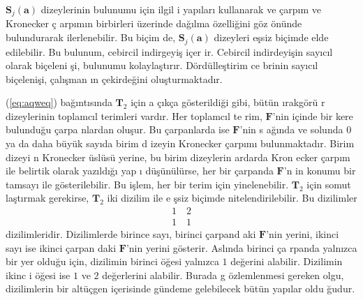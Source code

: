 \documentclass[a4paper,10pt]{article}
\begin{document}
$\mathbf{S}_{j}(\mathbf{a})$ dizeylerinin bulunumu i\c{c}in ilgil%
i yap\i lar{\i} kul\-la\-narak ve \c{c}arp\i m ve Kronecker \c{c}%
arp\i m\i n birbirleri \"uzerinde da\u{g}\i lma \"ozelli\u{g}ini %
g\"oz \"on\"unde bulundurarak iler\-le\-ne\-bilir. Bu bi\-\c{c}im%
de, $\mathbf{S}_{j}(\mathbf{a})$ dizeyleri e\c{s}siz bi\c{c}imde %
elde edilebilir. Bu bulunum, cebircil in\-dirgeyi\c{s} i\-\c{c}er%
ir. Cebircil indirdeyi\c{s}in sa\-y\i c\i l o\-larak bi\c{c}eleni%
\c{s}i, bulunumu kolayla\c{s}t\i r\i r. D\"ord\"ulle\c{s}tirim ce%
brinin say\i c\i l bi\c{c}e\-le\-ni\-\c{s}i, \c{c}a\-l\i \c{s}man%
\i n \c{c}ekirde\u{g}ini olu\c{s}turmaktad\i r.

(\ref{eq:aqweq}) ba\u{g}\i nt\i s\i nda $\mathbf{T}_{2}$ i\c{c}in a%
\c{c}\i k\c{c}a g\"osterildi\u{g}i gibi, b\"ut\"un \i rakg\"or\"u%
r dizeylerinin toplamc\i l terimleri vard\i r. Her toplamc\i l te%
rim, $\mathbf{F}$'nin i\c{c}inde bir kere bulundu\u{g}u \c{c}arpa%
nlardan olu\c{s}ur. Bu \c{c}arpanlar\-da i\-se $\mathbf{F}$'nin s%
a\u{g}\i nda ve solunda $0$ ya da daha b\"uy\"uk say\i da birim d%
izeyin Kronecker \c{c}arp\i m{\i} bulunmaktad\i r. Bi\-rim dizeyi%
n Kronecker \"usl\"us\"u yerine, bu birim dizeylerin ardarda Kron%
ecker \c{c}arp\i m ile belirtik olarak ya\-z\i ld\i \u{g}{\i} yap%
{\i} d\"u\c{s}\"un\"ul\"urse, her bir \c{c}arpanda $\mathbf{F}$'n%
in konumu bir tamsay{\i} ile g\"osterilebilir. Bu i\c{s}lem, her %
bir terim i\c{c}in yinelenebilir. $\mathbf{T}_{2}$ i\c{c}in somut%
la\c{s}t\i rmak gerekirse, $\mathbf{T}_{2}$ iki di\-zi\-lim ile e%
\c{s}siz bi\c{c}imde nitelendirilebilir. Bu dizilimler %
\begin{eqnarray}
 1\quad 2 \nonumber\\
 1\quad 1
\end{eqnarray}
dizilimleridir. Dizilimlerde birince say{\i}, birinci \c{c}arpand%
aki $\mathbf{F}$'nin yerini, ikinci say{\i} ise ikinci \c{c}arpan%
daki $\mathbf{F}$'nin yerini g\"osterir. Asl\i nda birinci \c{c}a%
rpanda yaln\i zca bir yer oldu\u{g}u i\c{c}in, dizilimin birinci %
\"o\u{g}esi yaln\i zca $1$ de\u{g}erini alabilir. Dizilimin ikinc%
i \"o\u{g}esi ise $1$ ve $2$ de\u{g}er\-lerini alabilir. Burada g%
\"ozlemlenmesi gereken olgu, di\-zilimlerin bir alt\"u\c{c}\-gen %
i\c{c}erisinde g\"undeme gelebilecek b\"ut\"un ya\-p\i lar ol\-du%
\u{g}udur. %
\end{document}
